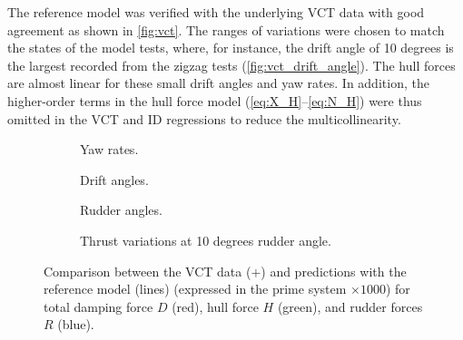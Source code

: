 The reference model was verified with the underlying VCT data with good agreement as shown in \autoref{fig:vct}. The ranges of variations were chosen to match the states of the model tests, where, for instance, the drift angle of 10 degrees is the largest recorded from the zigzag tests (\autoref{fig:vct_drift_angle}). The hull forces are almost linear for these small drift angles and yaw rates. In addition, the higher-order terms in the hull force model (\autoref{eq:X_H}--\autoref{eq:N_H}) were thus omitted in the VCT and ID regressions to reduce the multicollinearity.
\begin{figure}
    \centering
    \begin{subfigure}[b]{0.49\textwidth}
        \centering
        
        \caption{Yaw rates.}
        \label{fig:vct_circle}
    \end{subfigure}
    \hfill
    \begin{subfigure}[b]{0.49\textwidth}
        \centering
        
        \caption{Drift angles.}
        \label{fig:vct_drift_angle}
    \end{subfigure}
    \begin{subfigure}[b]{0.49\textwidth}
        \centering
        
        \caption{Rudder angles.}
        \label{fig:vct_rudder_angle}
    \end{subfigure}
    \hfill
    \begin{subfigure}[b]{0.49\textwidth}
        \centering
        
        \caption{Thrust variations at 10 degrees rudder angle.}
        \label{fig:vct_thrust_variation}
    \end{subfigure}
    \caption{Comparison between the VCT data ($+$) and predictions with the reference model (lines) (expressed in the prime system $\times 1000$) for total damping force $D$ (red), hull force $H$ (green), and rudder forces $R$ (blue).}
    \label{fig:vct}
\end{figure}